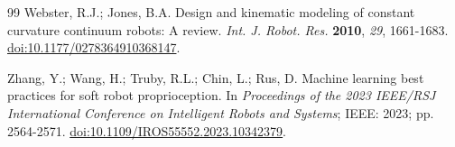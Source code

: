 \documentclass[preprints,article,submit,oneauthor]{Definitions/mdpi}
\begin{document}
\begin{thebibliography}{99}
Webster, R.J.; Jones, B.A. Design and kinematic modeling of constant curvature continuum robots: A review. \emph{Int. J. Robot. Res.} \textbf{2010}, \emph{29}, 1661-1683. \href{https://doi.org/10.1177/0278364910368147}{doi:10.1177/0278364910368147}.

Zhang, Y.; Wang, H.; Truby, R.L.; Chin, L.; Rus, D. Machine learning best practices for soft robot proprioception. In \emph{Proceedings of the 2023 IEEE/RSJ International Conference on Intelligent Robots and Systems}; IEEE: 2023; pp. 2564-2571. \href{https://doi.org/10.1109/IROS55552.2023.10342379}{doi:10.1109/IROS55552.2023.10342379}.

\end{thebibliography}

\PublishersNote{}
\end{document}

